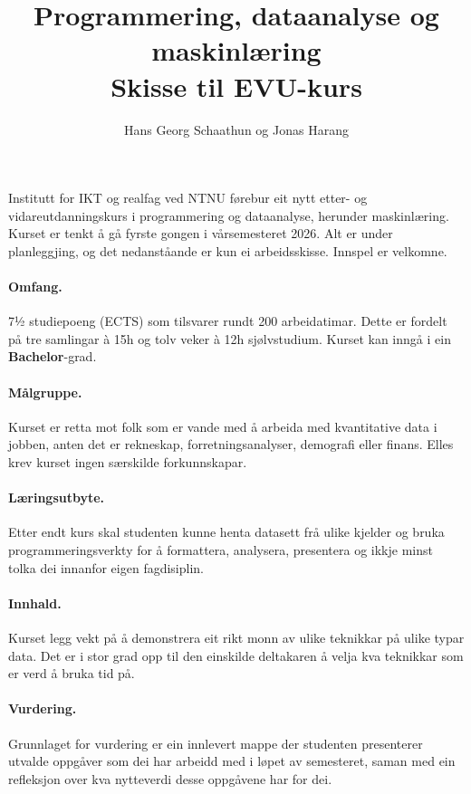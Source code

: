 \documentclass[nynorsk]{scrartcl}
\title{Programmering, dataanalyse og maskinlæring \\ \Large Skisse til EVU-kurs}
\author{Hans Georg Schaathun og Jonas Harang}
\begin{document}
\maketitle

Institutt for IKT og realfag ved NTNU førebur eit nytt etter- og
vidareutdanningskurs i programmering og dataanalyse, herunder maskinlæring.
Kurset er tenkt å gå fyrste gongen i vårsemesteret 2026.
Alt er under planleggjing, og det nedanståande er kun ei arbeidsskisse.
Innspel er velkomne.

\paragraph{Omfang.}  7½ studiepoeng (ECTS) som tilsvarer rundt 200 arbeidatimar.
Dette er fordelt på tre samlingar à 15h og tolv veker à 12h sjølvstudium.
Kurset kan inngå i ein \textbf{Bachelor}-grad.

\paragraph{Målgruppe.}  
Kurset er retta mot folk som er vande med å arbeida med kvantitative data i jobben,
anten det er rekneskap, forretningsanalyser, demografi eller finans.
Elles krev kurset ingen særskilde forkunnskapar.

\paragraph{Læringsutbyte.}  
Etter endt kurs skal studenten kunne henta datasett frå ulike kjelder og bruka
programmeringsverkty for å formattera, analysera, presentera og ikkje minst 
tolka dei innanfor eigen fagdisiplin.

\paragraph{Innhald.}  
Kurset legg vekt på å demonstrera eit rikt monn av ulike teknikkar på ulike
typar data.  Det er i stor grad opp til den einskilde deltakaren å velja kva
teknikkar som er verd å bruka tid på.

\paragraph{Vurdering.}  
Grunnlaget for vurdering er ein innlevert mappe der studenten presenterer
utvalde oppgåver som dei har arbeidd med i løpet av semesteret, saman med ein
refleksjon over kva nytteverdi desse oppgåvene har for dei.
\end{document}
